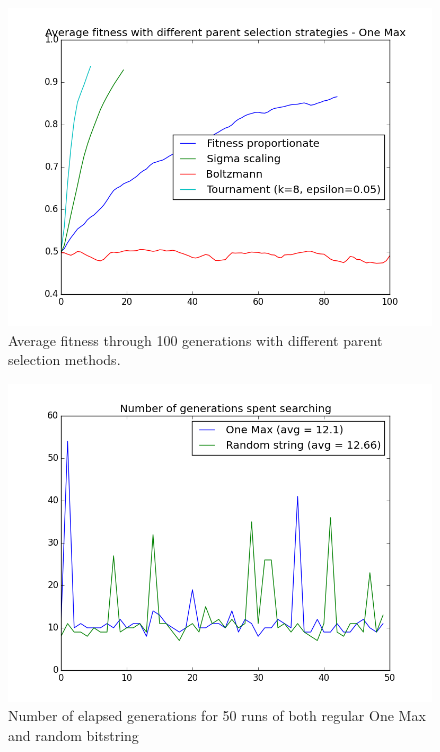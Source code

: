 \documentclass[twoside]{article}
\begin{document}
\begin{multicols}{2}
    \begin{figure}[H]
        \centering
        \includegraphics[width=\linewidth]{images/one-max-varying-parent-selection.png}
        \caption{Average fitness through 100 generations with different parent selection methods.} \label{fig:one-max-varying-parent-selection}
    \end{figure}


    \begin{figure}[H]
        \centering
        \includegraphics[width=\linewidth]{images/one-max-vs-random.png}
        \caption{Number of elapsed generations for 50 runs of both regular One Max and random bitstring} \label{fig:one-max-vs-random}
    \end{figure}



\end{multicols}
\end{document}
